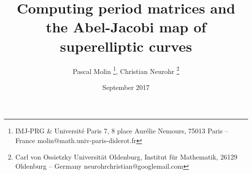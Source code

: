 \documentclass[10pt,a4paper]{article}
\title{Computing period matrices and the Abel-Jacobi map of superelliptic curves}
\author{%
    Pascal Molin
        \thanks{IMJ-PRG \& Université Paris 7,
        8 place Aurélie Nemours,
        75013 Paris -- France\newline
        molin@math.univ-paris-diderot.fr},
    Christian Neurohr
        \thanks{Carl von Ossietzky Universität Oldenburg,
        Institut für Mathematik,
        26129 Oldenburg -- Germany\newline
        neurohrchristian@googlemail.com}}
\date{September 2017}
\def\biblio{}
\begin{document}
\def\biblio{}

\maketitle
























\end{document}
